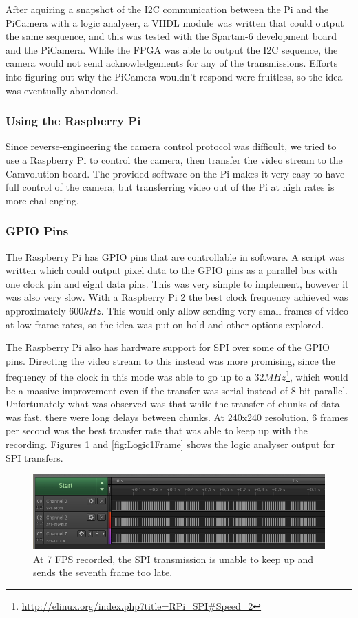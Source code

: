 After aquiring a snapshot of the I2C communication between the Pi and the PiCamera with a logic analyser,
a VHDL module was written that could output the same sequence,
and this was tested with the Spartan-6 development board and the PiCamera.
While the FPGA was able to output the I2C sequence,
the camera would not send acknowledgements for any of the transmissions.
Efforts into figuring out why the PiCamera wouldn't respond were fruitless, so the idea was eventually abandoned.

\subsubsection{Using the Raspberry Pi}
Since reverse-engineering the camera control protocol was difficult,
we tried to use a Raspberry Pi to control the camera,
then transfer the video stream to the Camvolution board.
The provided software on the Pi makes it very easy to have full control of the camera,
but transferring video out of the Pi at high rates is more challenging.

\subsubsection{GPIO Pins}
The Raspberry Pi has GPIO pins that are controllable in software.
A script was written which could output pixel data to the GPIO pins as a parallel bus with one clock pin and eight data pins.
This was very simple to implement, however it was also very slow.
With a Raspberry Pi 2 the best clock frequency achieved was approximately $600kHz$.
This would only allow sending very small frames of video at low frame rates,
so the idea was put on hold and other options explored.

The Raspberry Pi also has hardware support for SPI over some of the GPIO pins.
Directing the video stream to this instead was more promising,
since the frequency of the clock in this mode was able to go up to a $32MHz$\footnote{\url{http://elinux.org/index.php?title=RPi\_SPI\#Speed\_2}},
which would be a massive improvement even if the transfer was serial instead of 8-bit parallel.
Unfortunately what was observed was that while the transfer of chunks of data was fast,
there were long delays between chunks.
At 240x240 resolution, 6 frames per second was the best transfer rate that was able to keep up with the recording.
Figures \ref{fig:Logic7fps} and \ref{fig:Logic1Frame} shows the logic analyser output for SPI transfers.

\begin{figure}
    \centering
    \includegraphics[width=\linewidth]{img/logic/7fps}
    \caption{At 7 FPS recorded, the SPI transmission is unable to keep up and sends the seventh frame too late.}
    \label{fig:Logic7fps}
\end{figure}

